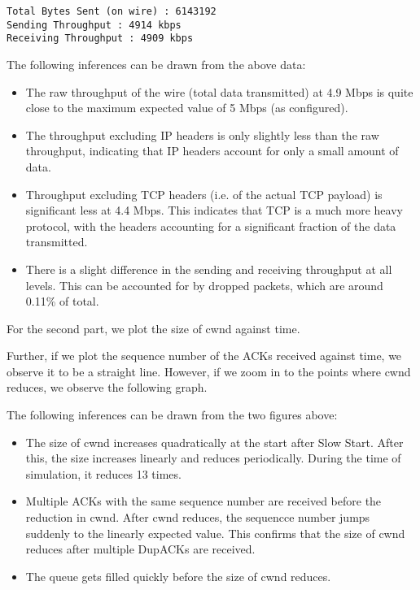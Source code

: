 \documentclass[a4paper]{article}
\begin{document}
\begin{enumerate}
\begin{verbatim}
Total Bytes Sent (on wire) : 6143192
Sending Throughput : 4914 kbps
Receiving Throughput : 4909 kbps
\end{verbatim}
The following inferences can be drawn from the above data:
\begin{itemize}
	\item The raw throughput of the wire (total data transmitted) at 4.9 Mbps is quite close to the maximum expected value of 5 Mbps (as configured).
	\item The throughput excluding IP headers is only slightly less than the raw throughput, indicating that IP headers account for only a small amount of data.
	\item Throughput excluding TCP headers (i.e. of the actual TCP payload) is significant less at 4.4 Mbps. This indicates that TCP is a much more heavy protocol, with the headers accounting for a significant fraction of the data transmitted.
	\item There is a slight difference in the sending and receiving throughput at all levels. This can be accounted for by dropped packets, which are around 0.11\% of total.
\end{itemize}
For the second part, we plot the size of cwnd against time.\\
\begin{center}\end{center}
Further, if we plot the sequence number of the ACKs received against time, we observe it to be a straight line. However, if we zoom in to the points where cwnd reduces, we observe the following graph.\\
\begin{center}\end{center}
The following inferences can be drawn from the two figures above:
\begin{itemize}
	\item The size of cwnd increases quadratically at the start after Slow Start. After this, the size increases linearly and reduces periodically. During the time of simulation, it reduces 13 times.
	\item Multiple ACKs with the same sequence number are received before the reduction in cwnd. After cwnd reduces, the sequencce number jumps suddenly to the linearly expected value. This confirms that the size of cwnd reduces after multiple DupACKs are received.
	\item The queue gets filled quickly before the size of cwnd reduces.
\end{itemize}


\end{enumerate}
\end{document}

